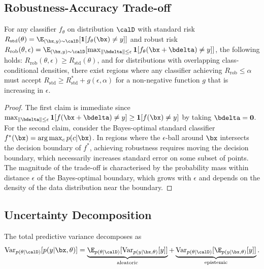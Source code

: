 \subsection{Robustness-Accuracy Trade-off}
\label{app:robustness_tradeoff}

\begin{proposition}
\label{prop:ra_tradeoff}
For any classifier $f_\theta$ on distribution $\calD$ with standard risk $R_{\mathrm{std}}(\theta) = \E_{(\bx,y)\sim\calD}[\mathbf{1}[f_\theta(\bx)\neq y]]$ and robust risk $R_{\mathrm{rob}}(\theta,\epsilon) = \E_{(\bx,y)\sim\calD}[\max_{\|\bdelta\|\le\epsilon}\mathbf{1}[f_\theta(\bx+\bdelta)\neq y]]$, the following holds: $R_{\mathrm{rob}}(\theta,\epsilon)\ge R_{\mathrm{std}}(\theta)$, and for distributions with overlapping class-conditional densities, there exist regions where any classifier achieving $R_{\mathrm{rob}}\le\alpha$ must accept $R_{\mathrm{std}}\ge R_{\mathrm{std}}^* + g(\epsilon,\alpha)$ for a non-negative function $g$ that is increasing in $\epsilon$.
\end{proposition}

\begin{proof}
The first claim is immediate since $\max_{\|\bdelta\|\le\epsilon}\mathbf{1}[f(\bx+\bdelta)\neq y]\ge\mathbf{1}[f(\bx)\neq y]$ by taking $\bdelta=\mathbf{0}$. For the second claim, consider the Bayes-optimal standard classifier $f^*(\bx) = \arg\max_c p(c|\bx)$. In regions where the $\epsilon$-ball around $\bx$ intersects the decision boundary of $f^*$, achieving robustness requires moving the decision boundary, which necessarily increases standard error on some subset of points. The magnitude of the trade-off is characterised by the probability mass within distance $\epsilon$ of the Bayes-optimal boundary, which grows with $\epsilon$ and depends on the density of the data distribution near the boundary.
\end{proof}


\subsection{Uncertainty Decomposition}
\label{app:uncertainty_decomp}

\begin{proposition}
\label{prop:uncertainty}
The total predictive variance decomposes as
\begin{equation}
\mathrm{Var}_{p(\theta|\calD)}[p(y|\bx,\theta)]
= \underbrace{\E_{p(\theta|\calD)}[\mathrm{Var}_{p(y|\bx,\theta)}[y]]}_{\text{aleatoric}}
+ \underbrace{\mathrm{Var}_{p(\theta|\calD)}[\E_{p(y|\bx,\theta)}[y]]}_{\text{epistemic}}.
\end{equation}
\end{proposition}

